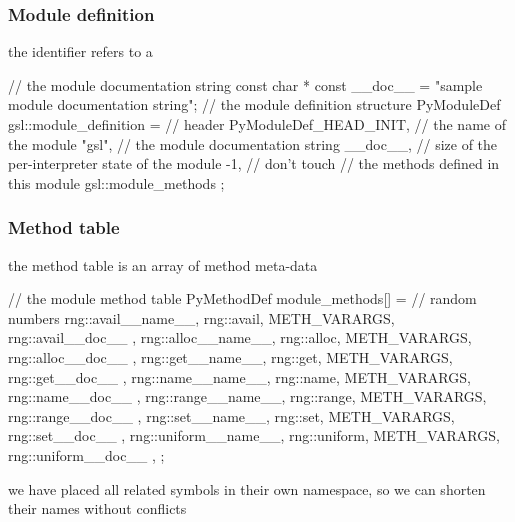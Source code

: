 %
%


\begin{frame}[fragile]
%
  \frametitle{Module definition}
%
  the identifier  refers to a 
  \begin{iC++}{}
// the module documentation string
const char * const __doc__ = "sample module documentation string";
// the module definition structure
PyModuleDef gsl::module_definition = {
    // header
    PyModuleDef_HEAD_INIT,
    // the name of the module
    "gsl",
    // the module documentation string
    __doc__,
    // size of the per-interpreter state of the module
    -1, // don't touch
    // the methods defined in this module
    gsl::module_methods
};
  \end{iC++}
%
\end{frame}

\begin{frame}[fragile]
%
  \frametitle{Method table}
%
  the method table is an array of method meta-data
%
  \begin{iC++}{}
// the module method table
PyMethodDef module_methods[] = {
    // random numbers
    { rng::avail__name__, rng::avail, METH_VARARGS, rng::avail__doc__ },
    { rng::alloc__name__, rng::alloc, METH_VARARGS, rng::alloc__doc__ },
    { rng::get__name__, rng::get, METH_VARARGS, rng::get__doc__ },
    { rng::name__name__, rng::name, METH_VARARGS, rng::name__doc__ },
    { rng::range__name__, rng::range, METH_VARARGS, rng::range__doc__ },
    { rng::set__name__, rng::set, METH_VARARGS, rng::set__doc__ },
    { rng::uniform__name__, rng::uniform, METH_VARARGS, rng::uniform__doc__ },
};
  \end{iC++}
%
  we have placed all  related symbols in their own namespace, so we can shorten
  their names without conflicts
%
\end{frame}

